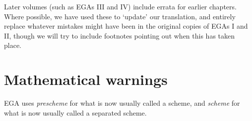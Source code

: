 \sectionbreak

Later volumes (such as EGAs III and IV) include errata for earlier chapters.
Where possible, we have used these to `update' our translation, and entirely replace whatever mistakes might have been in the original copies of EGAs I and II, though we will try to include footnotes pointing out when this has taken place.

\section*{Mathematical warnings}
EGA uses \emph{prescheme} for what is now usually called a scheme, and \emph{scheme} for what is now usually called a separated scheme.

\nocite{*}





